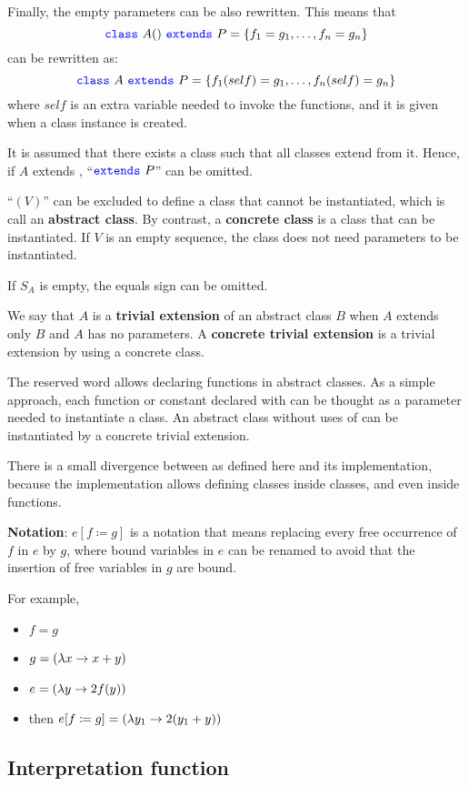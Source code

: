 Finally, the empty parameters can be also rewritten.
This means that
\[{\color{blue}\texttt{{class}}}\ A() \ {\color{blue}\texttt{{extends}}}\ P = \{
f_{1} = g_{1},
\ldots ,
f_{n} = g_{n}
\}
\]
can be rewritten as:
\[{\color{blue}\texttt{{class}}}\ A \ {\color{blue}\texttt{{extends}}}\ P = \{
f_{1}(self) = g_{1},
\ldots ,
f_{n}(self) = g_{n}
\}
\]
where $self$ is an extra variable needed to invoke the functions, and it is given when a class instance is created.

It is assumed that there exists a class  such that all classes extend from it.
Hence, if $A$ extends , ``${\color{blue}\texttt{{extends}}}\ P$'' can be omitted.

``$(V)$'' can be excluded to define a class that cannot be instantiated, which is call an \textbf{abstract class}.
By contrast, a \textbf{concrete class} is a class that can be instantiated.
If $V$ is an empty sequence, the class does not need parameters to be instantiated.

If $S_{A}$ is empty, the equals sign can be omitted.

We say that $A$ is a \textbf{trivial extension} of an abstract class $B$ when $A$ extends only $B$ and $A$ has no parameters.
A \textbf{concrete trivial extension} is a trivial extension by using a concrete class.

The \shas reserved word allows declaring functions in abstract classes.
As a simple approach, each function or constant declared with \shas can be thought as a parameter needed to instantiate a class.
An abstract class without uses of \shas can be instantiated by a concrete trivial extension.

There is a small divergence between \Soda as defined here and its implementation, because the implementation allows defining classes inside classes, and even inside functions.

\textbf{Notation}: $e[f \coloneqq g]$ is a notation that means replacing every free occurrence of $f$ in $e$ by $g$, where bound variables in $e$ can be renamed to avoid that the insertion of free variables in $g$ are bound.

For example,
\begin{itemize}
    \item $f = g$
    \item $g = (\lambda {x} \to {x + y})$
    \item $e = (\lambda {y} \to {2 f(y)})$
    \item then $e[f \coloneqq g] = (\lambda {y_{1}} \to {2 (y_{1} + y)})$
\end{itemize}

\subsection{Interpretation function}

